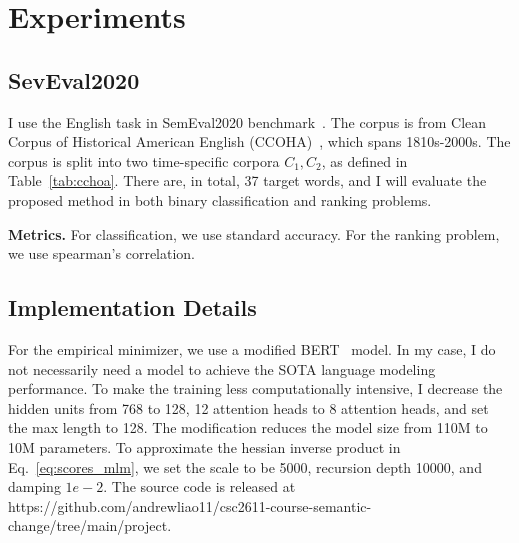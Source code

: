 
\section{Experiments}

\subsection{SevEval2020}

I use the English task in SemEval2020 benchmark~\cite{semeval2020}.
The corpus is from Clean Corpus of Historical American English (CCOHA)~\cite{ccoha1,ccoha2}, which spans 1810s-2000s.
The corpus is split into two time-specific corpora $C_1, C_2$, as defined in Table~\ref{tab:cchoa}.
There are, in total, 37 target words, and I will evaluate the proposed method in both binary classification and ranking problems.



\noindent\textbf{Metrics.} 
For classification, we use standard accuracy. For the ranking problem, we use spearman's correlation.

\begin{table}[th]
\centering
{}
\caption{Statistics of test corpora. TTR = Type-Token ratio (number of types / number of tokens * 1000)}
\label{tab:cchoa}
\end{table}


\subsection{Implementation Details}\label{sec:impl_details}
For the empirical minimizer, we use a modified BERT~\cite{BERT} model.
In my case, I do not necessarily need a model to achieve the SOTA language modeling performance. 
To make the training less computationally intensive, I decrease the hidden units from 768 to 128, 12 attention heads to 8 attention heads, and set the max length to 128.
The modification reduces the model size from 110M to 10M parameters.
To approximate the hessian inverse product in Eq.~\ref{eq:scores_mlm}, we set the scale to be 5000, recursion depth 10000, and damping $1e-2$.
The source code is released at https://github.com/andrewliao11/csc2611-course-semantic-change/tree/main/project.



